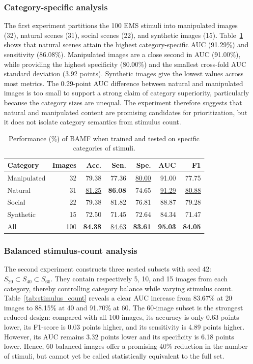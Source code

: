 \documentclass[conference,a4paper]{IEEEtran}
\begin{document}
\subsubsection{Category-specific analysis}
The first experiment partitions the 100 EMS stimuli into manipulated images (32), natural scenes (31), social scenes (22), and synthetic images (15). Table~\ref{tab:category_results} shows that natural scenes attain the highest category-specific AUC (91.29\%) and sensitivity (86.08\%). Manipulated images are a close second in AUC (91.00\%), while providing the highest specificity (80.00\%) and the smallest cross-fold AUC standard deviation (3.92 points). Synthetic images give the lowest values across most metrics. The 0.29-point AUC difference between natural and manipulated images is too small to support a strong claim of category superiority, particularly because the category sizes are unequal. The experiment therefore suggests that natural and manipulated content are promising candidates for prioritization, but it does not isolate category semantics from stimulus count.

\begin{table}[t]
\caption{Performance (\%) of BAMF when trained and tested on specific categories of stimuli.}
\label{tab:category_results}
\centering
\small
\setlength{\tabcolsep}{5.2pt}
\begin{tabular}{@{}lrrrrrr@{}}
\toprule
Category & Images & Acc. & Sen. & Spe. & AUC & F1 \\
\midrule
Manipulated & 32 & 79.38 & 77.36 & \underline{80.00} & 91.00 & 77.75 \\
Natural & 31 & \underline{81.25} & \textbf{86.08} & 74.65 & \underline{91.29} & \underline{80.88} \\
Social & 22 & 79.38 & 81.82 & 76.81 & 88.87 & 79.28 \\
Synthetic & 15 & 72.50 & 71.45 & 72.64 & 84.34 & 71.47 \\
All & 100 & \textbf{84.38} & \underline{84.63} & \textbf{83.61} & \textbf{95.03} & \textbf{84.05} \\
\bottomrule
\end{tabular}
\end{table}


\subsubsection{Balanced stimulus-count analysis}
The second experiment constructs three nested subsets with seed 42: $S_{20}\subset S_{40}\subset S_{60}$. They contain respectively 5, 10, and 15 images from each category, thereby controlling category balance while varying stimulus count. Table~\ref{tab:stimulus_count} reveals a clear AUC increase from 83.67\% at 20 images to 88.15\% at 40 and 91.70\% at 60. The 60-image subset is the strongest reduced design: compared with all 100 images, its accuracy is only 0.63 points lower, its F1-score is 0.03 points higher, and its sensitivity is 4.89 points higher. However, its AUC remains 3.32 points lower and its specificity is 6.18 points lower. Hence, 60 balanced images offer a promising 40\% reduction in the number of stimuli, but cannot yet be called statistically equivalent to the full set.
\end{document}
